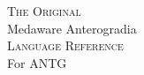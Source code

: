 \vspace*{\fill}
\begin{center}
	{\LARGE\textsc{The Original}} \\[5mm]
	{\Huge Medaware Anterogradia\texttrademark}\\[5mm]
	{\LARGE\textsc{Language Reference}} \\[10mm]
	\large For ANTG \antgversion
\end{center}
\vspace*{\fill}
\newpage
